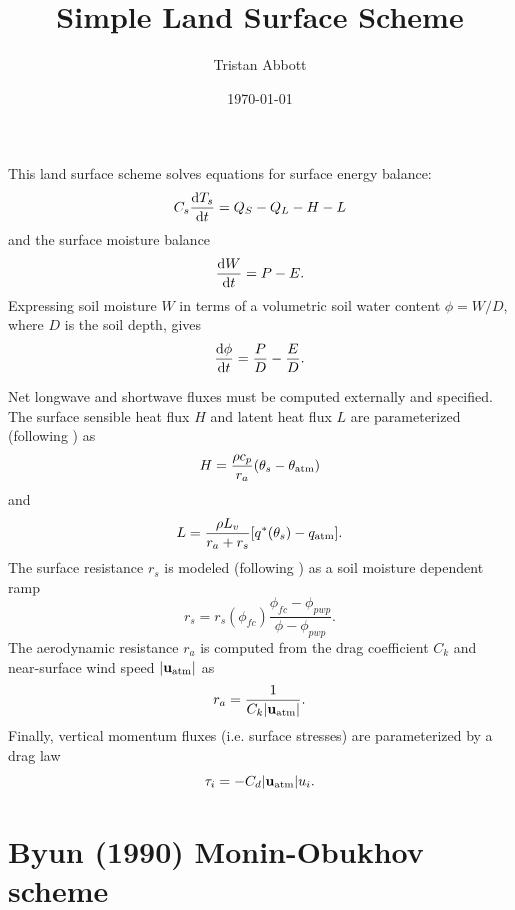 \documentclass[10pt]{article}
\title{Simple Land Surface Scheme}
\author{Tristan Abbott}
\date{\today}
\begin{document}
\maketitle

This land surface scheme solves equations for surface energy balance:
\begin{equation}
C_s \dv{T_s}{t} = Q_S - Q_L - H - L
\end{equation}
and the surface moisture balance
\begin{equation*}
\dv{W}{t} = P - E.
\end{equation*}
Expressing soil moisture $W$ in terms of a volumetric soil water content $\phi = W/D$, where $D$ is the soil depth, gives
\begin{equation}
\dv{\phi}{t} = \frac{P}{D} - \frac{E}{D}.
\end{equation}

Net longwave and shortwave fluxes must be computed externally and specified. The surface sensible heat flux $H$ and latent heat flux $L$ are parameterized (following \citet{RieckHoheneggerHeerwaarden2014}) as
\begin{equation} \label{eqn:H}
H = \frac{\rho c_p}{r_a} \qty (\theta_s - \theta_{\mathrm{atm}})
\end{equation}
and
\begin{equation} \label{eqn:S}
L = \frac{\rho L_v}{r_a + r_s} \qty [q^*(\theta_s) - q_{\mathrm{atm}}].
\end{equation}
The surface resistance $r_s$ is modeled (following \citet{HoheneggerStevens2018}) as a soil moisture dependent ramp
\begin{equation} \label{eqn:r_s}
r_s = r_s(\phi_{fc}) \frac{\phi_{fc} - \phi_{pwp}}{\phi - \phi_{pwp}}.
\end{equation}
The aerodynamic resistance $r_a$ is computed from the drag coefficient $C_k$ and near-surface wind speed $|{\bf u}_{\mathrm{atm}}|$ as
\begin{equation}
r_a = \frac{1}{C_k |{\bf u}_{\mathrm{atm}}|}.
\end{equation}
Finally, vertical momentum fluxes (i.e. surface stresses) are parameterized by a drag law
\begin{equation}
\tau_i = -C_d |{\bf u}_{\mathrm{atm}}| u_i.
\end{equation}

\section{Byun (1990) Monin-Obukhov scheme}
\end{document}
